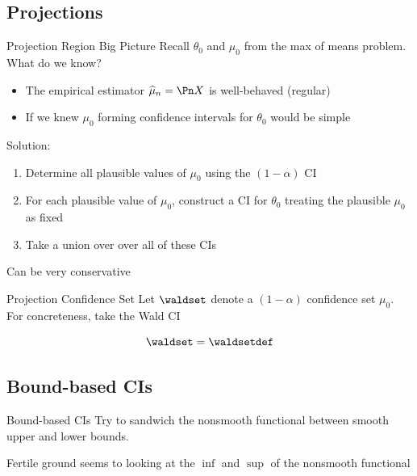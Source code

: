 \documentclass[aspectratio=169, professionalfonts, handout]{beamer}
\begin{document}
\subsection{Projections}
\begin{frame}{Projection Region Big Picture}
	Recall $\theta_0$ and $\mu_0$ from the max of means problem. What do we know?
	\begin{itemize}
		\item The empirical estimator $\widehat{\mu}_n = \Pn X$ is well-behaved
		      (regular)
		      \vfill \pause
		\item If we knew $\mu_0$ forming confidence intervals for ${\theta}_0$
		      would be simple%
	\end{itemize}
	\vfill \pause
	Solution:
	\begin{enumerate}
		\item Determine all plausible values of $\mu_0$ using the $(1- \alpha)$ CI
		\item For each plausible value of $\mu_0$, construct a CI for ${\theta}_0$
		      treating the plausible $\mu_0$ as fixed
		\item Take a union over over all of these CIs
	\end{enumerate}
	\vfill \pause
	Can be very conservative

\end{frame}
\begin{frame}{Projection Confidence Set}
	Let $\waldset$ denote a $(1-\alpha)$ confidence set $\mu_0$. For concreteness, take
	the Wald CI

	$$\waldset = \waldsetdef$$

	\vfill \pause
\end{frame}

\subsection{Bound-based CIs}
\begin{frame}{Bound-based CIs}
	Try to sandwich the nonsmooth functional between smooth upper and lower
	bounds.

	\vfill
	Fertile ground seems to looking at the $\inf$ and $\sup$ of the nonsmooth functional
\end{frame}
\end{document}

